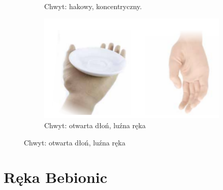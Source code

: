 \documentclass[8pt]{beamer}
\begin{document}
\begin{frame}[allowframebreaks]
\begin{center}
\begin{figure}
\begin{subfigure}[b]{0.4\textwidth}
                		\caption{Chwyt: hakowy, koncentryczny.}
                		\label{graph:g6}
        			\end{subfigure}%
        			\newline
        			\begin{subfigure}[b]{0.4\textwidth}
                		\includegraphics[width=\textwidth]{graphics/grip7.png}
                		\caption{Chwyt: otwarta dłoń, luźna ręka}
                		\label{graph:g7}
        			\end{subfigure}%
        			\end{figure}
				\end{center}
			
		\end{frame}
%		

\section{Ręka Bebionic}
\end{document}
